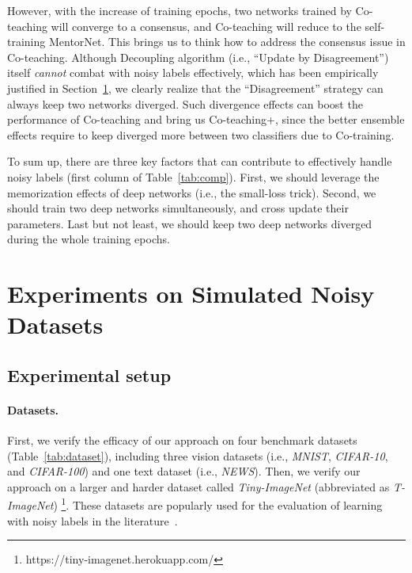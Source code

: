 \documentclass{article}
\begin{document}
However, with the increase of training epochs, two networks trained by Co-teaching will converge to a consensus, and Co-teaching will reduce to the self-training MentorNet. This brings us to think how to address the consensus issue in Co-teaching. Although Decoupling algorithm \cite{malach2017decoupling} (i.e., ``Update by Disagreement'') itself \textit{cannot} combat with noisy labels effectively, which has been empirically justified in Section~\ref{sect:experiments}, we clearly realize that the ``Disagreement'' strategy can always keep two networks diverged. Such divergence effects can boost the performance of Co-teaching and bring us Co-teaching+, since the better ensemble effects require to keep diverged more between two classifiers due to Co-training.

To sum up, there are three key factors that can contribute to effectively handle noisy labels (first column of Table~\ref{tab:comp}). First, we should leverage the memorization effects of deep networks (i.e., the small-loss trick). Second, we should train two deep networks simultaneously, and cross update their parameters. Last but not least, we should keep two deep networks diverged during the whole training epochs.

\section{Experiments on Simulated Noisy Datasets}
\label{sect:experiments}


\subsection{Experimental setup}\label{sec:setup}

\paragraph{Datasets.} First, we verify the efficacy of our approach on four benchmark datasets (Table~\ref{tab:dataset}), including three vision datasets (i.e., \textit{MNIST}, \textit{CIFAR-10}, and \textit{CIFAR-100}) and one text dataset (i.e., \textit{NEWS}). Then, we verify our approach on a larger and harder dataset called \textit{Tiny-ImageNet} (abbreviated as \textit{T-ImageNet}) \footnote{https://tiny-imagenet.herokuapp.com/}. These datasets are popularly used for the evaluation of learning with noisy labels in the literature~\cite{reed2014training, goldberger2016training, kiryo2017positive}.
\end{document}
